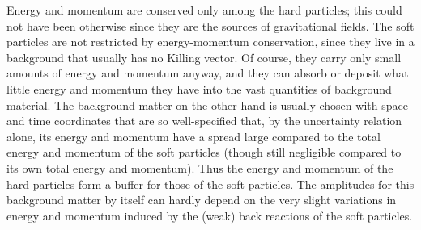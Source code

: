 Energy and momentum are conserved only among the hard particles; this
could not have been otherwise since they are the sources of
gravitational fields. The soft particles are not restricted by
energy-momentum conservation, since they live in a background that
usually has no Killing vector. Of course, they carry only small amounts
of energy and momentum anyway, and they can absorb or deposit what
little energy and momentum they have into the vast quantities of
background material. The background matter on the other hand is
usually chosen with space and time coordinates that are so
well-specified that, by the uncertainty relation alone, its energy and
momentum have a spread large compared to the total energy and momentum
of the soft particles (though still negligible compared to its own
total energy and momentum). Thus the energy and momentum of the hard
particles form a buffer for those of the soft particles. The
amplitudes for this background matter by itself can hardly depend
on the very slight variations in energy and momentum induced by the
(weak) back reactions of the soft particles.

